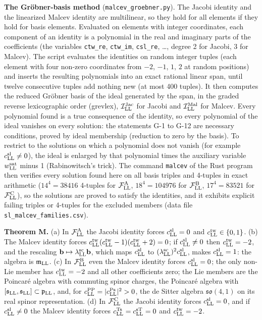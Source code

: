 \documentclass[
  10pt,
]{article}
\begin{document}
\textbf{The Gröbner-basis method} (\texttt{malcev\_groebner.py}). The
Jacobi identity and the linearized Malcev identity are multilinear, so
they hold for all elements if they hold for basis elements. Evaluated on
elements with integer coordinates, each component of an identity is a
polynomial in the real and imaginary parts of the coefficients (the
variables \texttt{ctw\_re}, \texttt{ctw\_im}, \texttt{csl\_re}, \ldots,
degree 2 for Jacobi, 3 for Malcev). The script evaluates the identities
on random integer tuples (each element with four non-zero coordinates
from \(-2\), \(-1\), \(1\), \(2\) at random positions) and inserts the
resulting polynomials into an exact rational linear span, until twelve
consecutive tuples add nothing new (at most 400 tuples). It then
computes the reduced Gröbner basis of the ideal generated by the span,
in the graded reverse lexicographic order (grevlex),
\(\mathcal I^{\rm Jac}_{\rm LL}\) for Jacobi and
\(\mathcal I^{\rm Mal}_{\rm LL}\) for Malcev. Every polynomial found is
a true consequence of the identity, so every polynomial of the ideal
vanishes on every solution: the statements G-1 to G-12 are necessary
conditions, proved by ideal membership (reduction to zero by the basis).
To restrict to the solutions on which a polynomial does not vanish (for
example \(c^{\rm sl}_{\rm LL}\neq0\)), the ideal is enlarged by that
polynomial times the auxiliary variable \(w^{\rm sat}_{\rm LL}\) minus 1
(Rabinowitsch's trick). The command \texttt{malcev} of the Rust program
then verifies every solution found here on all basis triples and
4-tuples in exact arithmetic (\(14^4=38416\) 4-tuples for
\(\mathcal F^{\rm A}_{\rm LL}\), \(18^4=104976\) for
\(\mathcal F^{\rm B}_{\rm LL}\), \(17^4=83521\) for
\(\mathcal F^{\rm C}_{\rm LL}\)), so the solutions are proved to satisfy
the identities, and it exhibits explicit failing triples or 4-tuples for
the excluded members (data file \texttt{sl\_malcev\_families.csv}).

\textbf{Theorem M.} (a) In \(\mathcal F^{\rm A}_{\rm LL}\) the Jacobi
identity forces \(c^{\rm sl}_{\rm LL}=0\) and
\(c^{\rm tw}_{\rm LL}\in\{0,1\}\). (b) The Malcev identity forces
\(c^{\rm tw}_{\rm LL}(c^{\rm tw}_{\rm LL}-1)(c^{\rm tw}_{\rm LL}+2)=0\);
if \(c^{\rm sl}_{\rm LL}\neq0\) then \(c^{\rm tw}_{\rm LL}=-2\), and the
rescaling \(\mathbf b\mapsto\lambda^{\rm sc}_{\rm LL}\mathbf b\), which
maps \(c^{\rm sl}_{\rm LL}\) to
\((\lambda^{\rm sc}_{\rm LL})^2c^{\rm sl}_{\rm LL}\), makes
\(c^{\rm sl}_{\rm LL}=1\): the algebra is \(\mathfrak m_{\rm LL}\). (c)
In \(\mathcal F^{\rm B}_{\rm LL}\) even the Malcev identity forces
\(c^{\rm sl}_{\rm LL}=0\); the only non-Lie member has
\(c^{\rm tw}_{\rm LL}=-2\) and all other coefficients zero; the Lie
members are the Poincaré algebra with commuting spinor charges, the
Poincaré algebra with
\([\mathfrak s_{\rm LL},\mathfrak s_{\rm LL}]\subset\mathfrak p_{\rm LL}\),
and, for \(c^{\rm PP}_{\rm LL}=\lvert c^{\rm Ps}_{\rm LL}\rvert^2>0\),
the de Sitter algebra \(\mathfrak{so}(4,1)\) on its real spinor
representation. (d) In \(\mathcal F^{\rm C}_{\rm LL}\) the Jacobi
identity forces \(c^{\rm sl}_{\rm LL}=0\), and if
\(c^{\rm sl}_{\rm LL}\neq0\) the Malcev identity forces
\(c^{\rm Ts}_{\rm LL}=c^{\rm sT}_{\rm LL}=0\) and
\(c^{\rm tw}_{\rm LL}=-2\).
\end{document}
